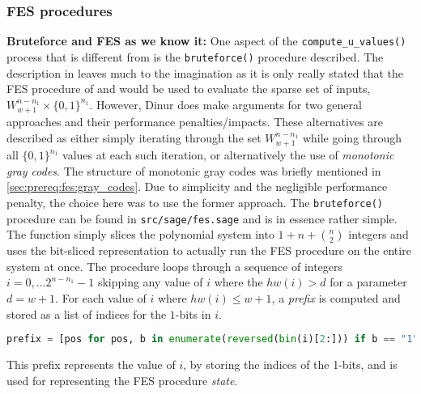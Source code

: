 \subsubsection{FES procedures} \label{sec:impl:fes}

\textbf{Bruteforce and FES as we know it:} One aspect of the \texttt{compute\_u\_values()} process that is different from \cite{cryptoeprint:2021/578} is the \texttt{bruteforce()} procedure described. The description in \cite{cryptoeprint:2021/578} leaves much to the imagination as it is only really stated that the FES procedure of \cite{cryptoeprint:2013/436} and \cite{cryptoeprint:2010/313} would be used to evaluate the sparse set of inputs, $W^{n - n_1}_{w + 1} \times \{0,1\}^{n_1}$. However, Dinur does make arguments for two general approaches and their performance penalties/impacts. These alternatives are described as either simply iterating through the set $W^{n - n_1}_{w + 1}$ while going through all $\{0,1\}^{n_1}$ values at each such iteration, or alternatively the use of \textit{monotonic gray codes}. The structure of monotonic gray codes was briefly mentioned in \cref{sec:prereq:fes:gray_codes}. Due to simplicity and the negligible performance penalty, the choice here was to use the former approach. 
The \texttt{bruteforce()} procedure can be found in \texttt{src/sage/fes.sage} and is in essence rather simple. The function simply slices the polynomial system into $1 + n + \binom{n}{2}$ integers and uses the bit-sliced representation to actually run the FES procedure on the entire system at once. The procedure loops through a sequence of integers $i = 0, \dots 2^{n - n_1} - 1$ skipping any value of $i$ where the $hw(i) > d$ for a parameter $d = w + 1$. For each value of $i$ where $hw(i) \leq w + 1$, a \textit{prefix} is computed and stored as a list of indices for the $1$-bits in $i$.
\begin{lstlisting}[language=python,style=mystyle]
prefix = [pos for pos, b in enumerate(reversed(bin(i)[2:])) if b == "1"]
\end{lstlisting}
This prefix represents the value of $i$, by storing the indices of the 1-bits, and is used for representing the FES procedure \textit{state}.

